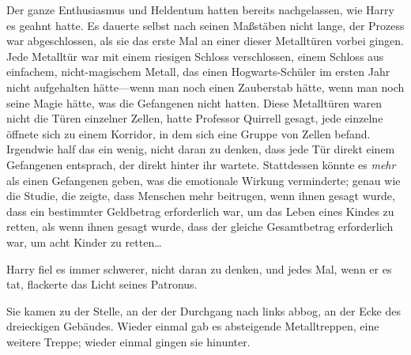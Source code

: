 Der ganze Enthusiasmus und Heldentum hatten bereits nachgelassen, wie Harry es geahnt hatte. Es dauerte selbst nach seinen Maßstäben nicht lange, der Prozess war abgeschlossen, als sie das erste Mal an einer dieser Metalltüren vorbei gingen. Jede Metalltür war mit einem riesigen Schloss verschlossen, einem Schloss aus einfachem, nicht-magischem Metall, das einen Hogwarts-Schüler im ersten Jahr nicht aufgehalten hätte—wenn man noch einen Zauberstab hätte, wenn man noch seine Magie hätte, was die Gefangenen nicht hatten. Diese Metalltüren waren nicht die Türen einzelner Zellen, hatte Professor Quirrell gesagt, jede einzelne öffnete sich zu einem Korridor, in dem sich eine Gruppe von Zellen befand. Irgendwie half das ein wenig, nicht daran zu denken, dass jede Tür direkt einem Gefangenen entsprach, der direkt hinter ihr wartete. Stattdessen könnte es \emph{mehr} als einen Gefangenen geben, was die emotionale Wirkung verminderte; genau wie die Studie, die zeigte, dass Menschen mehr beitrugen, wenn ihnen gesagt wurde, dass ein bestimmter Geldbetrag erforderlich war, um das Leben eines Kindes zu retten, als wenn ihnen gesagt wurde, dass der gleiche Gesamtbetrag erforderlich war, um acht Kinder zu retten…

Harry fiel es immer schwerer, nicht daran zu denken, und jedes Mal, wenn er es tat, flackerte das Licht seines Patronus.

Sie kamen zu der Stelle, an der der Durchgang nach links abbog, an der Ecke des dreieckigen Gebäudes. Wieder einmal gab es absteigende Metalltreppen, eine weitere Treppe; wieder einmal gingen sie hinunter.

